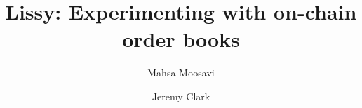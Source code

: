 \documentclass[envcountsect]{llncs}
\begin{document}
\frontmatter
\mainmatter

\title{\Large \bf Lissy: Experimenting with on-chain order books}

\author{Mahsa Moosavi \and Jeremy Clark }


\maketitle


















\appendix

\end{document}
